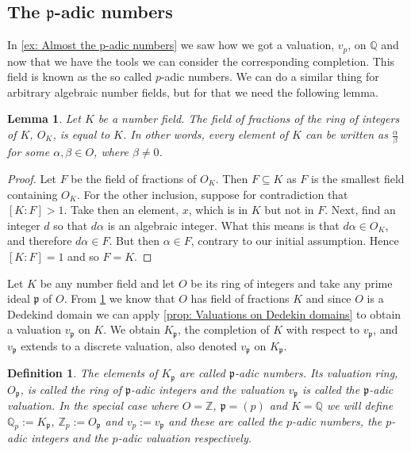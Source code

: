 \documentclass{article}
\newtheorem{definition}{Definition}[section]
\newtheorem{lemma}{Lemma}[section]
\newcommand{\mfrak}[1]{\mathfrak{#1}}
\newcommand{\mbb}[1]{\mathbb{#1}}
\newcommand{\vp}{{v_{\mfrak p}}}
\numberwithin{equation}{section}
\begin{document}
\subsection{The $\mfrak p$-adic numbers}

In \cref{ex: Almost the p-adic numbers} we saw how we got a valuation, $v_p$, on $\mbb Q$ and now that we have the tools we can consider the corresponding completion. This field is known as the so called $p$-adic numbers. We can do a similar thing for arbitrary algebraic number fields, but for that we need the following lemma. 

\begin{lemma} \label{lem: Field of fractions of ring of integers is number field}
    Let $K$ be a number field. The field of fractions of the ring of integers of $K$, $O_K$, is equal to $K$. In other words, every element of $K$ can be written as $\frac{\alpha}{\beta}$ for some $\alpha, \beta \in O$, where $\beta \neq 0$.
\end{lemma}
\begin{proof}
    Let $F$ be the field of fractions of $O_K$. Then $F \subseteq K$ as $F$ is the smallest field containing $O_K$. For the other inclusion, suppose for contradiction that $[K : F] > 1$. Take then an element, $x$, which is in $K$ but not in $F$. Next, find an integer $d$ so that $d \alpha$ is an algebraic integer. What this means is that $d \alpha \in O_K$, and therefore $d \alpha \in F$. But then $\alpha \in F$, contrary to our initial assumption. Hence $[K : F] = 1$ and so $F = K$.
\end{proof}

Let $K$ be any number field and let $O$ be its ring of integers and take any prime ideal $\mfrak p$ of $O$. From 
\cref{lem: Field of fractions of ring of integers is number field} we know that $O$ has field of fractions $K$ and since $O$ is a Dedekind domain we can apply \cref{prop: Valuations on Dedekin domains} to obtain a valuation $\vp$ on $K$. We obtain $K_\mfrak p$, the completion of $K$ with respect to $\vp$, and $\vp$ extends to a discrete valuation, also denoted $\vp$ on $K_\mfrak p$.

\begin{definition}\label{def: P-adic numbers}
The elements of $K_\mfrak p$ are called $\mfrak p$-adic numbers. Its valuation ring, $O_\mfrak p$, is called the ring of $\mfrak p$-adic integers and the valuation $\vp$ is called the $\mfrak p$-adic valuation. In the special case where $O = \mbb Z$, $\mfrak p = (p)$ and $K = \mbb Q$ we will define $\mbb Q_p := K_\mfrak p$, $\mbb Z_p := O_\mfrak p$ and $v_p := \vp$ and these are called the $p$-adic numbers, the $p$-adic integers and the $p$-adic valuation respectively.
\end{definition}  
\end{document}
